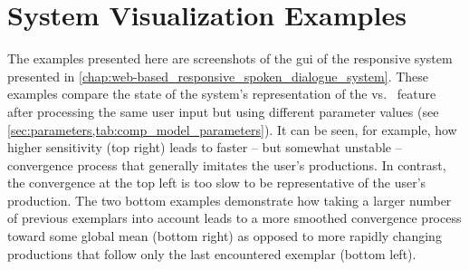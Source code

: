 \chapter{System Visualization Examples}
\label{app:system_examples}

The examples presented here are screenshots of the \acl{gui} of the responsive system presented in \cref{chap:web-based_responsive_spoken_dialogue_system}. These examples compare the state of the system's representation of the \textipa{[e]} vs.\ \textipa{[E]} feature after processing the same user input but using different parameter values (see \cref{sec:parameters,tab:comp_model_parameters}).
It can be seen, for example, how higher sensitivity (top right) leads to faster -- but somewhat unstable -- convergence process that generally imitates the user's productions.
In contrast, the convergence at the top left is too slow to be representative of the user's production.
The two bottom examples demonstrate how taking a larger number of previous exemplars into account leads to a more smoothed convergence process toward some global mean (bottom right) as opposed to more rapidly changing productions that follow only the last encountered exemplar (bottom left).

\begin{landscape}
	\begin{figure}[H]
		\centering
		\hspace*{-4.7cm}
	\end{figure}
	\begin{figure}[H]
		\centering
		\hspace*{-4.7cm}
	\end{figure}
\end{landscape}